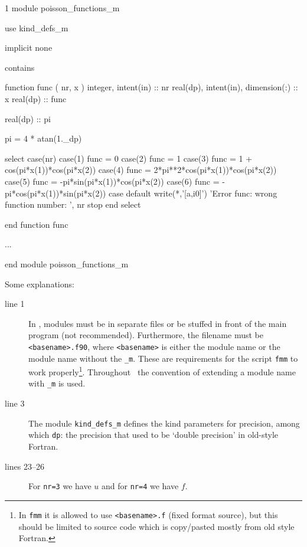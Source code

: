 \begin{listing}{1}
module poisson_functions_m
                                                                                
  use kind_defs_m
                                                                                
  implicit none
                                                                                
contains

  function func ( nr, x )
    integer, intent(in) :: nr
    real(dp), intent(in), dimension(:) :: x
    real(dp) :: func

    real(dp) :: pi

    pi = 4 * atan(1._dp)

    select case(nr)
      case(1)
        func = 0
      case(2)
        func = 1
      case(3)
        func = 1 + cos(pi*x(1))*cos(pi*x(2))
      case(4)
        func = 2*pi**2*cos(pi*x(1))*cos(pi*x(2))
      case(5)
        func = -pi*sin(pi*x(1))*cos(pi*x(2))
      case(6)
        func = -pi*cos(pi*x(1))*sin(pi*x(2))
      case default
        write(*,'[a,i0]') 'Error func: wrong function number: ', nr
        stop
    end select

  end function func

  ...

end module poisson_functions_m

\end{listing}

Some explanations:
\begin{description}
   \item [line 1] In \tfem, modules must be in separate files or be stuffed in
front of the main program (not recommended). Furthermore, the filename must be
\texttt{<basename>.f90}, where \texttt{<basename>} is either the module name or
the module name without the \texttt{\_m}. These are requirements for the script
\texttt{fmm} to work properly\footnote{In \texttt{fmm} it is allowed to use
\texttt{<basename>.f} (fixed format source), but this should be limited to
source code which is copy/pasted mostly from old style Fortran.}. Throughout
\tfem\ the convention of extending a module name with \texttt{\_m} is used.

   \item [line 3] The module \texttt{kind\_defs\_m} defines the kind parameters
    for precision, among which \texttt{dp}: the precision that used to be
    `double precision' in old-style Fortran. 

    \item [lines 23--26] For \texttt{nr=3} we have $u$ and for \texttt{nr=4} we have
    $f$.
\end{description}

